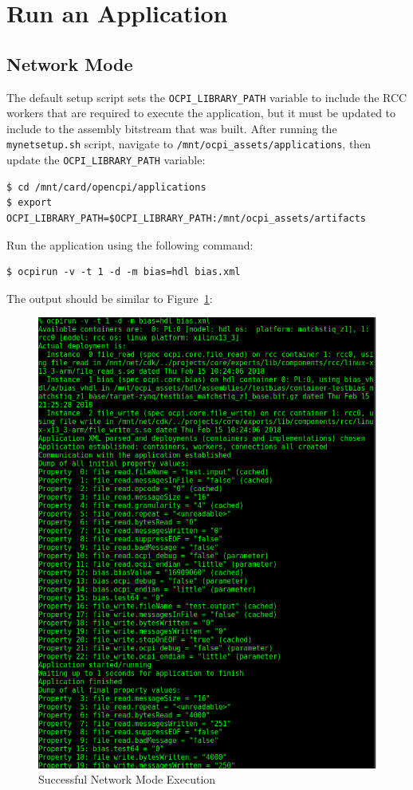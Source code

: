\section{Run an Application}
\subsection{Network Mode}
The default setup script sets the \texttt{OCPI\_LIBRARY\_PATH} variable to include the RCC workers that are required to execute the application, but it must be updated to include to the assembly bitstream that was built.  After running the \texttt{mynetsetup.sh} script, navigate to  \texttt{/mnt/ocpi\_assets/applications}, then update the \texttt{OCPI\_LIBRARY\_PATH} variable:
\begin{verbatim}
$ cd /mnt/card/opencpi/applications
$ export OCPI_LIBRARY_PATH=$OCPI_LIBRARY_PATH:/mnt/ocpi_assets/artifacts
\end{verbatim}
Run the application using the following command:
\begin{verbatim}
$ ocpirun -v -t 1 -d -m bias=hdl bias.xml
\end{verbatim}
The output should be similar to Figure~\ref{fig:netBias}:
\begin{figure}[H]
	\centerline{\includegraphics[scale=0.5]{Matchstiq_Z1_net_bias}}
	\caption{Successful Network Mode Execution}
	\label{fig:netBias}
\end{figure}

